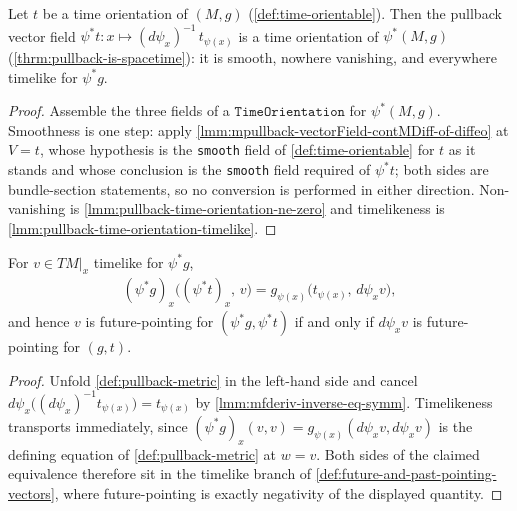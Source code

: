 \begin{lemma}
    \label{lmm:pullback-time-orientation}
    Let $t$ be a time orientation of $(M,g)$ (\ref{def:time-orientable}). Then the pullback vector field $\psi^*t : x \mapsto (d\psi_x)^{-1}\,t_{\psi(x)}$ is a time orientation of $\psi^*(M,g)$ (\ref{thrm:pullback-is-spacetime}): it is smooth, nowhere vanishing, and everywhere timelike for $\psi^*g$.
\end{lemma}
\begin{proof}
    Assemble the three fields of a $\mathtt{TimeOrientation}$ for $\psi^*(M,g)$. Smoothness is one step: apply \ref{lmm:mpullback-vectorField-contMDiff-of-diffeo} at $V = t$, whose hypothesis is the \texttt{smooth} field of \ref{def:time-orientable} for $t$ as it stands and whose conclusion is the \texttt{smooth} field required of $\psi^*t$; both sides are bundle-section statements, so no conversion is performed in either direction. Non-vanishing is \ref{lmm:pullback-time-orientation-ne-zero} and timelikeness is \ref{lmm:pullback-time-orientation-timelike}.
\end{proof}

\begin{lemma}
    \label{lmm:pullback-future-pointing-timelike}
    For $v \in TM|_x$ timelike for $\psi^*g$,
    \begin{align}
        (\psi^*g)_x\big((\psi^*t)_x,\, v\big) = g_{\psi(x)}\big(t_{\psi(x)},\, d\psi_x v\big),
    \end{align}
    and hence $v$ is future-pointing for $(\psi^*g, \psi^*t)$ if and only if $d\psi_x v$ is future-pointing for $(g,t)$.
\end{lemma}
\begin{proof}
    Unfold \ref{def:pullback-metric} in the left-hand side and cancel $d\psi_x\big((d\psi_x)^{-1} t_{\psi(x)}\big) = t_{\psi(x)}$ by \ref{lmm:mfderiv-inverse-eq-symm}. Timelikeness transports immediately, since $(\psi^*g)_x(v,v) = g_{\psi(x)}(d\psi_x v, d\psi_x v)$ is the defining equation of \ref{def:pullback-metric} at $w = v$. Both sides of the claimed equivalence therefore sit in the timelike branch of \ref{def:future-and-past-pointing-vectors}, where future-pointing is exactly negativity of the displayed quantity.
\end{proof}

